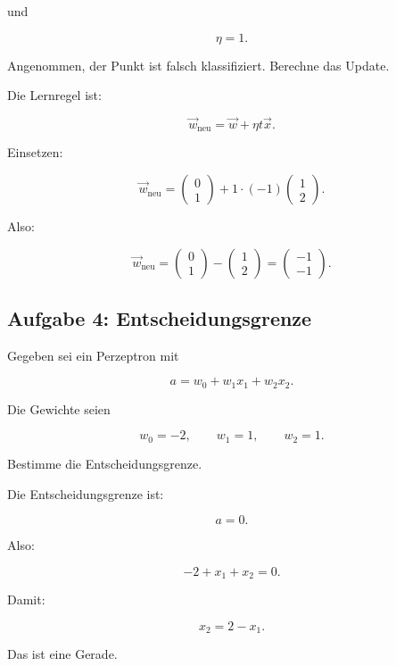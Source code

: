 und

\[
    \eta=1.
\]

Angenommen, der Punkt ist falsch klassifiziert.
Berechne das Update.

\begin{examplebox}
Die Lernregel ist:

\[
    \vec{w}_{\mathrm{neu}}
    =
    \vec{w}
    +
    \eta t\vec{x}.
\]

Einsetzen:

\[
    \vec{w}_{\mathrm{neu}}
    =
    \begin{pmatrix}
        0 \\
        1
    \end{pmatrix}
    +
    1\cdot(-1)
    \begin{pmatrix}
        1 \\
        2
    \end{pmatrix}.
\]

Also:

\[
    \vec{w}_{\mathrm{neu}}
    =
    \begin{pmatrix}
        0 \\
        1
    \end{pmatrix}
    -
    \begin{pmatrix}
        1 \\
        2
    \end{pmatrix}
    =
    \begin{pmatrix}
        -1 \\
        -1
    \end{pmatrix}.
\]
\end{examplebox}

\subsection{Aufgabe 4: Entscheidungsgrenze}

Gegeben sei ein Perzeptron mit

\[
    a
    =
    w_0+w_1x_1+w_2x_2.
\]

Die Gewichte seien

\[
    w_0=-2,
    \qquad
    w_1=1,
    \qquad
    w_2=1.
\]

Bestimme die Entscheidungsgrenze.

\begin{examplebox}
Die Entscheidungsgrenze ist:

\[
    a=0.
\]

Also:

\[
    -2+x_1+x_2=0.
\]

Damit:

\[
    x_2
    =
    2-x_1.
\]

Das ist eine Gerade.
\end{examplebox}


